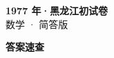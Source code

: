 \documentclass[zihao=-4, a4paper]{ctexart}
\begin{document}
\begin{center}
  {\Large\bfseries 1977 年·黑龙江初试卷}\\[4pt]
  {\large 数学 · 简答版}
\end{center}
\medskip
{}

\clearpage
{}
\begin{center}{\Large\bfseries 答案速查}\end{center}
\medskip

\end{document}
